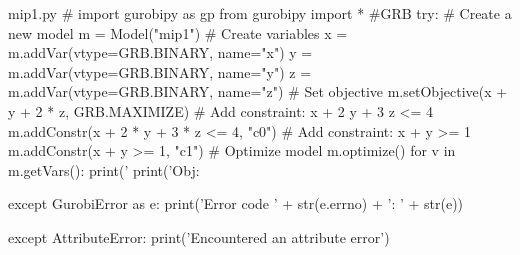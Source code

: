 \documentclass[bwprint,fontset=fandol]{gmcmthesis}
\begin{document}
\begin{appendices}
\begin{Python}{mip1.py}
# import gurobipy as gp
from gurobipy import * #GRB
try:
    # Create a new model
    m = Model("mip1")
    # Create variables
    x = m.addVar(vtype=GRB.BINARY, name="x")
    y = m.addVar(vtype=GRB.BINARY, name="y")
    z = m.addVar(vtype=GRB.BINARY, name="z")
    # Set objective
    m.setObjective(x + y + 2 * z, GRB.MAXIMIZE)
    # Add constraint: x + 2 y + 3 z <= 4
    m.addConstr(x + 2 * y + 3 * z <= 4, "c0")
    # Add constraint: x + y >= 1
    m.addConstr(x + y >= 1, "c1")
    # Optimize model
    m.optimize()
    for v in m.getVars():
        print('%
    print('Obj: %

except GurobiError as e:
    print('Error code ' + str(e.errno) + ': ' + str(e))

except AttributeError:
    print('Encountered an attribute error')
\end{Python}

\end{appendices}
\end{document}
